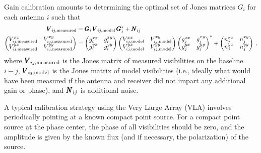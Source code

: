 \begin{bibunit}
Gain calibration amounts to determining the optimal set of Jones matrices $G_i$ for each antenna $i$
such that
\begin{align}
    \pmb V_{ij, \text{measured}} &= \pmb G_i \, \pmb V_{ij, \text{model}} \, \pmb G_j^*
        + \pmb N_{ij} \\
    \begin{pmatrix}
        V_{ij, \text{measured}}^{xx} & V_{ij, \text{measured}}^{xy} \\
        V_{ij, \text{measured}}^{yx} & V_{ij, \text{measured}}^{yy} \\
    \end{pmatrix} &=
    \begin{pmatrix}
        g_{i}^{xx} & g_{i}^{xy} \\
        g_{i}^{yx} & g_{i}^{yy} \\
    \end{pmatrix}
    \begin{pmatrix}
        V_{ij, \text{model}}^{xx} & V_{ij, \text{model}}^{xy} \\
        V_{ij, \text{model}}^{yx} & V_{ij, \text{model}}^{yy} \\
    \end{pmatrix}
    \begin{pmatrix}
        g_{j}^{xx} & g_{j}^{xy} \\
        g_{j}^{yx} & g_{j}^{yy} \\
    \end{pmatrix}^* +
    \begin{pmatrix}
        n_{j}^{xx} & n_{j}^{xy} \\
        n_{j}^{yx} & n_{j}^{yy} \\
    \end{pmatrix}\,,
\end{align}
where $\pmb V_{ij,\text{measured}}$ is the Jones matrix of measured visibilities on the baseline
$i-j$, $\pmb V_{ij,\text{model}}$ is the Jones matrix of model visibilities (i.e., ideally what would
have been measured if the antenna and receiver did not impart any additional gain or phase), and $\pmb
N_{ij}$ is additional noise.

A typical calibration strategy using the Very Large Array (VLA) involves periodically pointing at a
known compact point source. For a compact point source at the phase center, the phase of all
visibilities should be zero, and the amplitude is given by the known flux (and if necessary, the
polarization) of the source.


\end{bibunit}
